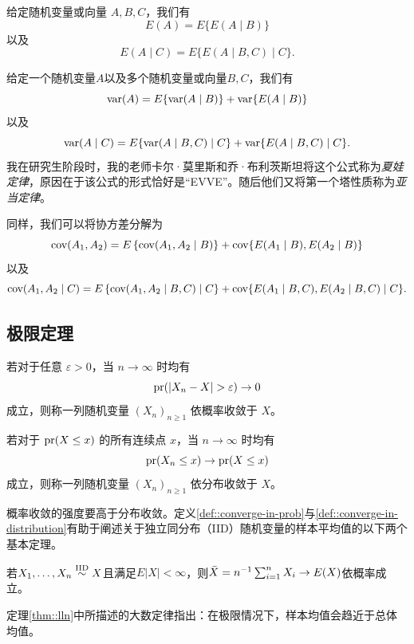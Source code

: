 给定随机变量或向量 $A, B, C$，我们有
$$
E(A) = E\{   E(A \mid B) \} 
$$
以及
$$
E(A\mid C) = E\{   E(A \mid B, C) \mid C \}. 
$$

 
给定一个随机变量$A$以及多个随机变量或向量$B, C$，我们有
$$
\textup{var}(A) = E\{   \textup{var}(A \mid B) \}  +  \textup{var}\{   E(A \mid B) \} 
$$
以及
$$
\textup{var}(A\mid C) = E\{   \textup{var}(A \mid B, C)  \mid C \}  +  \textup{var}\{   E(A \mid B, C)\mid C \}  .
$$
我在研究生阶段时，我的老师卡尔·莫里斯和乔·布利茨斯坦将这个公式称为{\it 夏娃定律}，原因在于该公式的形式恰好是“EVVE”。随后他们又将第一个塔性质称为{\it 亚当定律}。



同样，我们可以将协方差分解为
$$
\textup{cov}(A_1, A_2) = E\left\{ \textup{cov}(A_1, A_2\mid B)   \right\} + \textup{cov}\{ E(A_1\mid B), E(A_2\mid B)  \}
$$
以及
$$
\textup{cov}(A_1, A_2\mid C) = E\left\{ \textup{cov}(A_1, A_2\mid B, C)  \mid C \right\} + \textup{cov}\{ E(A_1\mid B, C), E(A_2\mid B, C) \mid C  \}.
$$


\subsection{极限定理}


\begin{definition}
[概率收敛]\label{def::converge-in-prob}
若对于任意 $\varepsilon > 0$，当 $n\rightarrow \infty$ 时均有
$$
\textup{pr} (   |X_n - X| > \varepsilon  ) \rightarrow 0
$$
成立，则称一列随机变量 $(X_n)_{n\geq 1}$ 依概率收敛于 $X$。 
\end{definition}



\begin{definition}
[分布收敛]\label{def::converge-in-distribution}
若对于 $ \textup{pr}(X\leq x) $ 的所有连续点 $x$，当 $n\rightarrow \infty$ 时均有$$
\textup{pr}(X_n \leq x) \rightarrow \textup{pr}(X\leq x)
$$成立，则称一列随机变量 $(X_n)_{n\geq 1}$ 依分布收敛于 $X$。 
\end{definition}


概率收敛的强度要高于分布收敛。定义\ref{def::converge-in-prob}与\ref{def::converge-in-distribution}有助于阐述关于独立同分布（IID）随机变量的样本平均值的以下两个基本定理。 



\begin{theorem}[大数定律]
\label{thm::lln}
若$X_1,\ldots, X_n \stackrel{\textup{IID}}{\sim} X$且满足$E| X| <\infty$，则$\bar{X} = n^{-1} \sum_{i=1}^n X_i \rightarrow E(X)$依概率成立。 
\end{theorem}


定理\ref{thm::lln}中所描述的大数定律指出：在极限情况下，样本均值会趋近于总体均值。 

